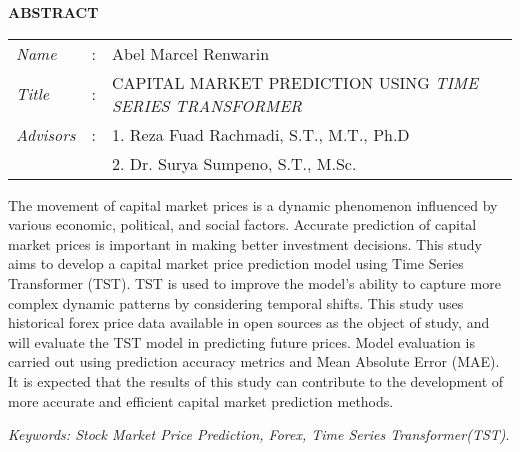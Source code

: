 \begin{center}
  \large\textbf{ABSTRACT}
\end{center}


\vspace{2ex}

\begingroup
\setlength{\tabcolsep}{0pt}

\noindent
\begin{tabularx}{\textwidth}{l >{\centering}m{3em} X}
  \emph{Name}     & : & {Abel Marcel Renwarin}         \\

  \emph{Title}    & : & {CAPITAL MARKET PREDICTION USING \textit{TIME SERIES TRANSFORMER}}   \\

  \emph{Advisors} & : & 1. {Reza Fuad Rachmadi, S.T., M.T., Ph.D}   \\
                  &   & 2. {Dr. Surya Sumpeno, S.T., M.Sc.} \\
\end{tabularx}
\endgroup

The movement of capital market prices is a dynamic phenomenon influenced by various economic, political, and social factors. Accurate prediction of capital market prices is important in making better investment decisions. This study aims to develop a capital market price prediction model using Time Series Transformer (TST). TST is used to improve the model's ability to capture more complex dynamic patterns by considering temporal shifts. This study uses historical forex price data available in open sources as the object of study, and will evaluate the TST model in predicting future prices. Model evaluation is carried out using prediction accuracy metrics and Mean Absolute Error (MAE). It is expected that the results of this study can contribute to the development of more accurate and efficient capital market prediction methods.

\emph{Keywords: Stock Market Price Prediction, Forex, Time Series Transformer(TST)}.
